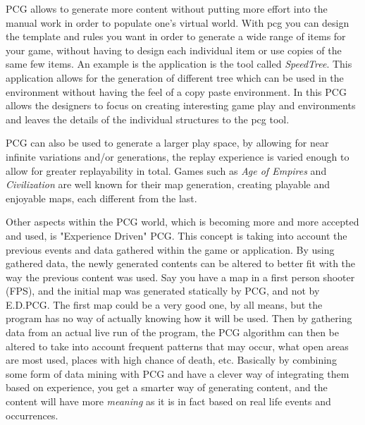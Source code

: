 PCG allows to generate more content without putting more effort into the manual work in order to populate one's virtual world. With pcg you can design the template and rules you want in order to generate a wide range of items for your game, without having to design each individual item or use copies of the same few items. An example is the application is the tool called \textit{SpeedTree}. This application allows for the generation of different tree which can be used in the environment without having the feel of a copy paste environment. In this PCG allows the designers to focus on creating interesting game play and environments and leaves the details of the individual structures to the pcg tool. 

PCG can also be used to generate a larger play space, by allowing for near infinite variations and/or generations, the replay experience is varied enough to allow for greater replayability in total. Games such as \textit{Age of Empires} and \textit{Civilization} are well known for their map generation, creating playable and enjoyable maps, each different from the last.


Other aspects within the PCG world, which is becoming more and more accepted and used, is "Experience Driven" PCG\cite{art:exppcg}. This concept is taking into account the previous events and data gathered within the game or application. By using gathered data, the newly generated contents can be altered to better fit with the way the previous content was used. Say you have a map in a first person shooter (FPS), and the initial map was generated statically by PCG, and not by E.D.PCG. The first map could be a very good one, by all means, but the program has no way of actually knowing how it will be used. Then by gathering data from an actual live run of the program, the PCG algorithm can then be altered to take into account frequent patterns that may occur, what open areas are most used, places with high chance of death, etc. Basically by combining some form of data mining with PCG and have a clever way of integrating them based on experience, you get a smarter way of generating content, and the content will have more \textit{meaning} as it is in fact based on real life events and occurrences.

